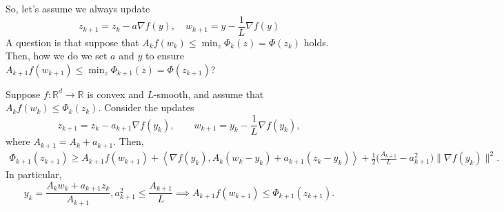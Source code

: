 	So, let's assume we always update 
	\begin{equation}
		z_{k+1} = z_k - a \nabla f(y), \quad w_{k+1} = y - \frac{1}{L} \nabla f(y)
	\end{equation}
	A question is that suppose that $A_k f(w_k) \leq \min_{z} \Phi_k (z) = \Phi(z_k)$ holds. Then, how we do we set $a$ and $y$ to ensure $A_{k+1} f(w_{k+1}) \leq \min_{z} \Phi_{k+1} (z) = \Phi(z_{k+1})$?

	\begin{lemma}
	  \label{thm:one-step-estimate}
		Suppose $f: \mathbb{R}^d \to \mathbb{R}$ is convex and $L$-smooth,
		and assume that $A_k f(w_k) \leq \Phi_k(z_k)$. Consider the updates
		\begin{equation}
			z_{k+1} = z_k - a_{k+1}\nabla f(y_k), \qquad w_{k+1} = y_k - \frac{1}{L}\nabla f(y_k),
		\end{equation}
		where $A_{k+1} = A_k + a_{k+1}$. Then,
		\begin{align}
			\Phi_{k+1}(z_{k+1}) \geq A_{k+1}f(w_{k+1})
			+ \left\langle \nabla f(y_k), A_k(w_k-y_k) + a_{k+1}(z_k-y_k) \right\rangle + \frac{1}{2} \big(\frac{A_{k+1}}{L}-a_{k+1}^2\big) \|\nabla f(y_k)\|^2. 
		\end{align}
		In particular, 
		\begin{equation}
			y_k = \frac{A_kw_k+a_{k+1}z_k}{A_{k+1}}, a_{k+1}^2 \leq \frac{A_{k+1}}{L} \implies A_{k+1}f(w_{k+1}) \leq \Phi_{k+1}(z_{k+1}).
		\end{equation}
	\end{lemma}
